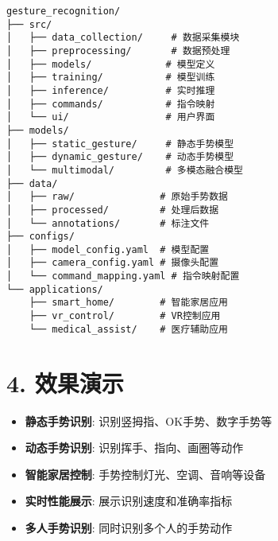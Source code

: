 \begin{lstlisting}
gesture_recognition/
├── src/
│   ├── data_collection/     # 数据采集模块
│   ├── preprocessing/       # 数据预处理
│   ├── models/             # 模型定义
│   ├── training/           # 模型训练
│   ├── inference/          # 实时推理
│   ├── commands/           # 指令映射
│   └── ui/                 # 用户界面
├── models/
│   ├── static_gesture/     # 静态手势模型
│   ├── dynamic_gesture/    # 动态手势模型
│   └── multimodal/         # 多模态融合模型
├── data/
│   ├── raw/               # 原始手势数据
│   ├── processed/         # 处理后数据
│   └── annotations/       # 标注文件
├── configs/
│   ├── model_config.yaml  # 模型配置
│   ├── camera_config.yaml # 摄像头配置
│   └── command_mapping.yaml # 指令映射配置
└── applications/
    ├── smart_home/        # 智能家居应用
    ├── vr_control/        # VR控制应用
    └── medical_assist/    # 医疗辅助应用
\end{lstlisting}

\section{4. 效果演示}\label{ux6548ux679cux6f14ux793a}

\begin{itemize}
\tightlist
\item
  \textbf{静态手势识别}: 识别竖拇指、OK手势、数字手势等
\item
  \textbf{动态手势识别}: 识别挥手、指向、画圈等动作
\item
  \textbf{智能家居控制}: 手势控制灯光、空调、音响等设备
\item
  \textbf{实时性能展示}: 展示识别速度和准确率指标
\item
  \textbf{多人手势识别}: 同时识别多个人的手势动作
\end{itemize}
